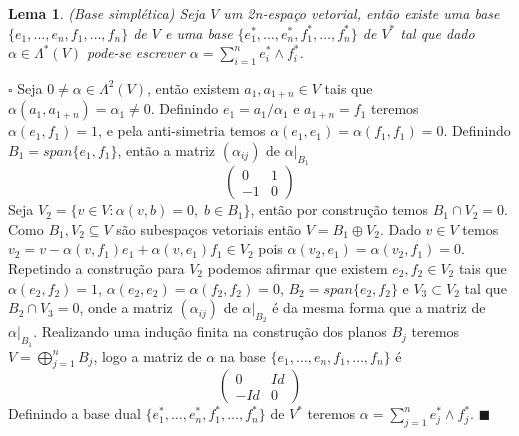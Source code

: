 \documentclass[12pt]{book}
\newtheorem{lema}[teorema]{Lema}
\newenvironment{prova}[1]{$\square$ #1}{\hfill$\blacksquare$}
\begin{document}
	\begin{lema}
		(Base simplética) Seja $V$ um 2n-espaço vetorial, então existe uma base $\{ e_{1},\dots, e_{n}, f_{1},\dots, f_{n}\}$ de $V$ e uma base $\{e_{1}^{*}, \dots, e_{n}^{*}, f_{1}^{*}, \dots,f_{n}^{*}\}$ de $V^{*}$ tal que dado $\alpha \in \Lambda^{*}(V)$ pode-se escrever $\alpha = \sum_{i=1}^{n} e^{*}_{i}\wedge f^{*}_{i}$.
	\end{lema}
	\begin{prova}
		Seja $0\neq \alpha \in \Lambda^{2}(V) $, então existem $ a_{1}, a_{1+n} \in V $ tais que $\alpha(a_{1}, a_{1+n}) = \alpha_{1} \neq 0$. Definindo $e_{1} = a_{1}/\alpha_{1}$ e $a_{1+n} = f_{1}$ teremos $\alpha(e_{1}, f_{1}) = 1$, e pela anti-simetria temos $\alpha(e_{1}, e_{1}) = \alpha(f_{1}, f_{1}) = 0$. Definindo $B_{1}=span \{e_{1}, f_{1}\}$, então a matriz $(\alpha_{ij})$ de $\alpha|_{B_{1}}$
		$$
		\left(
		\begin{array}{cc}
		0 & 1
		\\
		-1 & 0
		\end{array}
		\right)
		$$
		Seja  $V_{2} = \{v \in V: \alpha(v, b) = 0,\; b \in B_{1}\}$, então por construção temos $B_{1} \cap V_{2} = 0$. Como $B_{1}, V_{2} \subseteq V$ são subespaços vetoriais então $V = B_{1}\oplus V_{2}$. Dado $v \in V$ temos $v_{2} =v- \alpha(v,f_{1})e_{1} +\alpha(v,e_{1})f_{1} \in V_{2}$ pois $\alpha(v_{2}, e_{1}) = \alpha(v_{2}, f_{1}) = 0$. Repetindo a construção para $V_{2}$ podemos afirmar que existem $e_{2}, f_{2} \in V_{2}$ tais que $\alpha(e_{2}, f_{2}) = 1$, $\alpha(e_{2}, e_{2}) = \alpha(f_{2}, f_{2}) = 0$, $B_{2} = span\{e_{2}, f_{2} \}$ e $V_{3} \subset V_{2}$ tal que $B_{2}\cap V_{3}=0$, onde a matriz $(\alpha_{ij})$ de $\alpha|_{B_{2}}$ é da mesma forma que a matriz de $\alpha|_{B_{1}}$. Realizando uma indução finita na construção dos planos $B_{j}$ teremos $V = \bigoplus_{j=1}^{n}B_{j}$, logo a matriz de $\alpha$ na base  $\{ e_{1},\dots, e_{n}, f_{1},\dots, f_{n}\}$ é
		$$
		\left(
		\begin{array}{cc}
		0 & Id
		\\
		-Id & 0
		\end{array}
		\right)
		$$
		Definindo a base dual $\{e_{1}^{*}, \dots, e_{n}^{*}, f_{1}^{*}, \dots,f_{n}^{*}\}$ de $V^{*}$ teremos $\alpha = \sum_{j=1}^{n}e_{j}^{*}\wedge f_{j}^{*}$.
	\end{prova}
	
\end{document}
